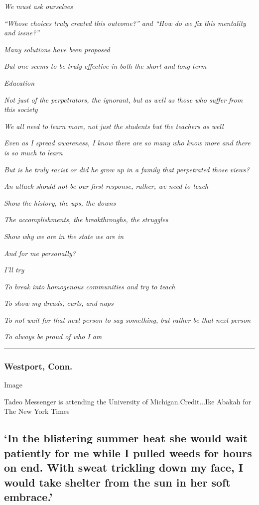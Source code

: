 \emph{We must ask ourselves}

\emph{``Whose choices truly created this outcome?'' and ``How do we fix
this mentality and issue?''}

\emph{Many solutions have been proposed}

\emph{But one seems to be truly effective in both the short and long
term}

\emph{Education}

\emph{Not just of the perpetrators, the ignorant, but as well as those
who suffer from this society}

\emph{We all need to learn more, not just the students but the teachers
as well}

\emph{Even as I spread awareness, I know there are so many who know more
and there is so much to learn}

\emph{But is he truly racist or did he grow up in a family that
perpetrated those views?}

\emph{An attack should not be our first response, rather, we need to
teach}

\emph{Show the history, the ups, the downs}

\emph{The accomplishments, the breakthroughs, the struggles}

\emph{Show why we are in the state we are in}

\emph{And for me personally?}

\emph{I'll try}

\emph{To break into homogenous communities and try to teach}

\emph{To show my dreads, curls, and naps}

\emph{To not wait for that next person to say something, but rather be
that next person}

\emph{To always be proud of who I am}

\begin{center}\rule{0.5\linewidth}{\linethickness}\end{center}

\hypertarget{westport-conn}{%
\subsubsection{Westport, Conn.}\label{westport-conn}}

Image

Tadeo Messenger is attending the University of Michigan.Credit...Ike
Abakah for The New York Times

\hypertarget{in-the-blistering-summer-heat-she-would-wait-patiently-for-me-while-i-pulled-weeds-for-hours-on-end-with-sweat-trickling-down-my-face-i-would-take-shelter-from-the-sun-in-her-soft-embrace}{%
\subsection{`In the blistering summer heat she would wait patiently for
me while I pulled weeds for hours on end. With sweat trickling down my
face, I would take shelter from the sun in her soft
embrace.'}\label{in-the-blistering-summer-heat-she-would-wait-patiently-for-me-while-i-pulled-weeds-for-hours-on-end-with-sweat-trickling-down-my-face-i-would-take-shelter-from-the-sun-in-her-soft-embrace}}

